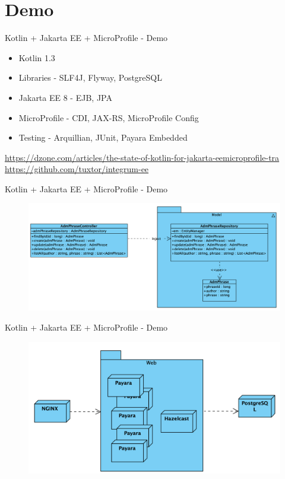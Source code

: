 \documentclass[aspectratio=169]{beamer}
\begin{document}
\section{Demo}
\begin{frame}{Kotlin + Jakarta EE + MicroProfile  - Demo}

\begin{itemize}
	\item Kotlin 1.3
	\item Libraries - SLF4J, Flyway, PostgreSQL
	\item Jakarta EE 8 - EJB, JPA
	\item MicroProfile - CDI, JAX-RS, MicroProfile Config
	\item Testing - Arquillian, JUnit, Payara Embedded
\end{itemize}


\normalsize  \url{https://dzone.com/articles/the-state-of-kotlin-for-jakarta-eemicroprofile-tra}\\
\normalsize  \url{https://github.com/tuxtor/integrum-ee}
\end{frame}

\begin{frame}{Kotlin + Jakarta EE + MicroProfile  - Demo}
\begin{figure}
	\centering
	\includegraphics[width=\linewidth]{Images/integrum-ee}
\end{figure}
\end{frame}

\begin{frame}{Kotlin + Jakarta EE + MicroProfile  - Demo}
\begin{figure}
	\centering
	\includegraphics[width=\linewidth]{Images/integrum-deployment}
\end{figure}
\end{frame}
\end{document}

